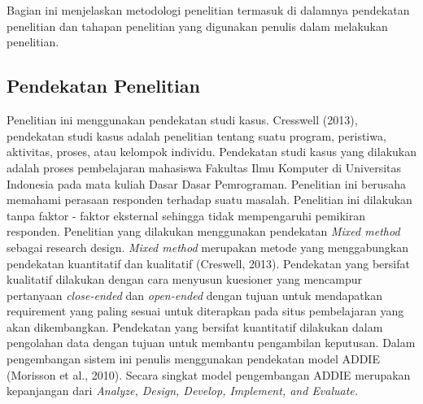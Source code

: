 \chapter{\babTiga}
Bagian ini menjelaskan metodologi penelitian termasuk di dalamnya pendekatan penelitian dan tahapan penelitian yang digunakan penulis dalam melakukan penelitian.
\section{Pendekatan Penelitian}

Penelitian ini  menggunakan pendekatan studi kasus. Cresswell (2013), pendekatan studi kasus adalah penelitian tentang suatu program, peristiwa, aktivitas, proses, atau kelompok individu.
\linebreak\linebreak
Pendekatan studi kasus yang dilakukan adalah proses pembelajaran mahasiswa Fakultas Ilmu Komputer di Universitas Indonesia pada mata kuliah Dasar Dasar Pemrograman. Penelitian ini berusaha memahami perasaan responden terhadap suatu masalah. Penelitian ini dilakukan tanpa faktor - faktor eksternal sehingga tidak mempengaruhi pemikiran responden.
\linebreak\linebreak
Penelitian yang dilakukan menggunakan pendekatan \textit{Mixed method} sebagai research design. \textit{Mixed method} merupakan metode yang menggabungkan pendekatan kuantitatif dan kualitatif (Creswell, 2013). Pendekatan yang bersifat kualitatif dilakukan dengan cara menyusun kuesioner yang mencampur pertanyaan \textit{close-ended} dan \textit{open-ended} dengan tujuan untuk mendapatkan requirement yang paling sesuai untuk diterapkan pada situs pembelajaran yang akan dikembangkan. Pendekatan yang bersifat kuantitatif dilakukan dalam pengolahan data dengan tujuan untuk membantu pengambilan keputusan.
\linebreak\linebreak
Dalam pengembangan sistem ini penulis menggunakan pendekatan model ADDIE  (Morisson et al., 2010). Secara singkat model pengembangan ADDIE merupakan kepanjangan dari \textit{Analyze, Design, Develop, Implement, and Evaluate.}

